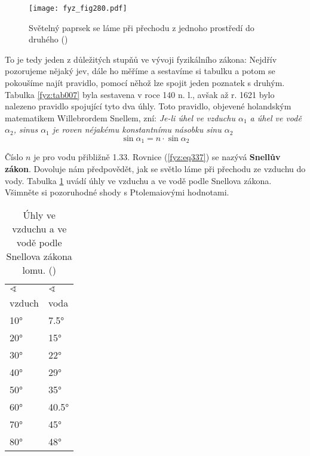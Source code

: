     \begin{figure}[ht!] %
      \centering
      \texttt{[image: fyz\_fig280.pdf]}
      \caption{Světelný paprsek se láme při přechodu z jednoho prostředí do druhého
               (\cite[s.~346]{Feynman01})}
      \label{fyz:fig280}
    \end{figure}
    
    To je tedy jeden z důležitých stupňů ve vývoji fyzikálního zákona: Nejdřív pozorujeme nějaký 
    jev, dále ho měříme a sestavíme si tabulku a potom se pokoušíme najít pravidlo, pomocí něhož
    lze spojit jeden poznatek s druhým. Tabulka \ref{fyz:tab007} byla sestavena v roce 140 n. l., 
    avšak až r. 1621 bylo nalezeno pravidlo spojující tyto dva úhly. Toto pravidlo, objevené 
    holandským matematikem Willebrordem Snellem, zní: \emph{Je-li úhel ve vzduchu \(\alpha_1\) a 
    úhel ve vodě \(\alpha_2\), sinus \(\alpha_1\) je roven néjakému konstantnímu násobku sinu 
    \(\alpha_2\)}
    \begin{equation}\label{fyz:eq337}
      \sin\alpha_1 = n\cdot\sin\alpha_2
    \end{equation}
    
    Číslo \(n\) je pro vodu přibližně \num{1.33}. Rovnice (\ref{fyz:eq337}) se nazývá 
    \textbf{Snellův zákon}. Dovoluje nám předpovědět, jak se světlo láme při přechodu ze vzduchu do 
    vody. Tabulka \ref{fyz:tab008} uvádí úhly ve vzduchu a ve vodě podle Snellova zákona. Všimněte 
    si pozoruhodné shody s Ptolemaiovými hodnotami.

    \begin{table}[ht!]     %
      \centering
      \renewcommand{\arraystretch}{1.4}
      \begin{tabular}{>{\centering\arraybackslash}p{3em}|>{\centering\arraybackslash}p{3em}}
         \hline \(\sphericalangle\) & \(\sphericalangle\)     \\
                    vzduch & voda         \\
         \hline   \ang{10} & \ang{7.5}    \\
                  \ang{20} & \ang{15}     \\
                  \ang{30} & \ang{22}     \\
                  \ang{40} & \ang{29}     \\
                  \ang{50} & \ang{35}     \\
                  \ang{60} & \ang{40.5}   \\
                  \ang{70} & \ang{45}     \\
                  \ang{80} & \ang{48}     \\
         \hline 
      \end{tabular}
      \caption{Úhly ve vzduchu a ve vodě podle Snellova zákona lomu.
               (\cite[s.~347]{Feynman01})}
      \label{fyz:tab008}
    \end{table}
    
